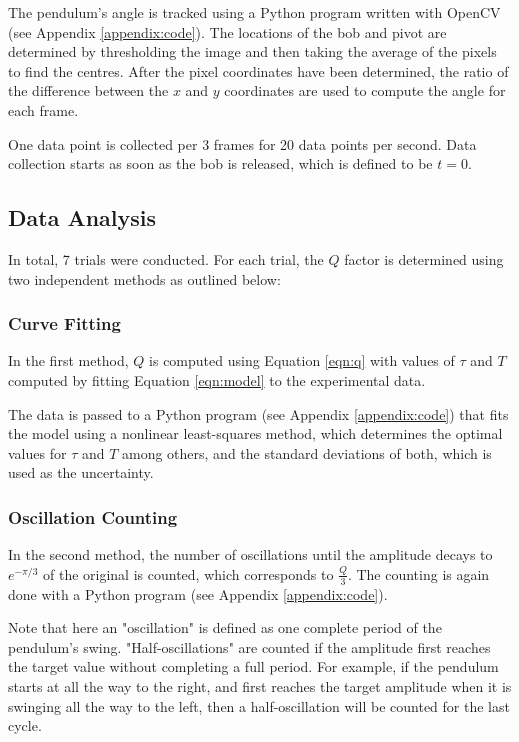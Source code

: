 \documentclass[aps,twocolumn,secnumarabic,nobalancelastpage,amsmath,amssymb,nofootinbib]{revtex4}
\begin{document}
The pendulum's angle is tracked using a Python program written with OpenCV (see Appendix \ref{appendix:code}).
The locations of the bob and pivot are determined by thresholding the image and then taking the average of the pixels to
find the centres. After the pixel coordinates have been determined, the ratio of the difference between the \(x\) and
\(y\) coordinates are used to compute the angle for each frame.

One data point is collected per 3 frames for 20 data points per second. Data collection starts as soon as the bob is
released, which is defined to be \(t = 0\).

\subsection{Data Analysis}

In total, 7 trials were conducted.
For each trial, the \(Q\) factor is determined using two independent methods as outlined below:

\subsubsection{Curve Fitting}

In the first method, \(Q\) is computed using Equation \ref{eqn:q} with values of \(\tau\) and \(T\) computed by fitting
Equation \ref{eqn:model} to the experimental data.

The data is passed to a Python program (see Appendix \ref{appendix:code}) that fits the model using a nonlinear
least-squares method, which determines the optimal values for \(\tau\) and \(T\) among others, and the standard
deviations of both, which is used as the uncertainty.

\subsubsection{Oscillation Counting}
\label{section:method:oscillation}

In the second method, the number of oscillations until the amplitude decays to \(e^{-\pi/3}\) of the original is
counted, which corresponds to \(\frac{Q}{3}\). The counting is again done with a Python program (see Appendix
\ref{appendix:code}).

Note that here an "oscillation" is defined as one complete period of the pendulum's swing. "Half-oscillations" are
counted if the amplitude first reaches the target value without completing a full period. For example, if the pendulum
starts at all the way to the right, and first reaches the target amplitude when it is swinging all the way to the left,
then a half-oscillation will be counted for the last cycle.
\end{document}

